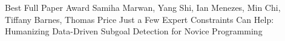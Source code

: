 \documentclass[a4paper,landscape]{article} %
\begin{document}
\diploma
    {Best Full Paper Award}
    {Samiha Marwan, Yang Shi, Ian Menezes, Min Chi, Tiffany Barnes, Thomas Price}
    {Just a Few Expert Constraints Can Help: Humanizing Data-Driven Subgoal Detection for Novice Programming}
\hfill
\end{document}
